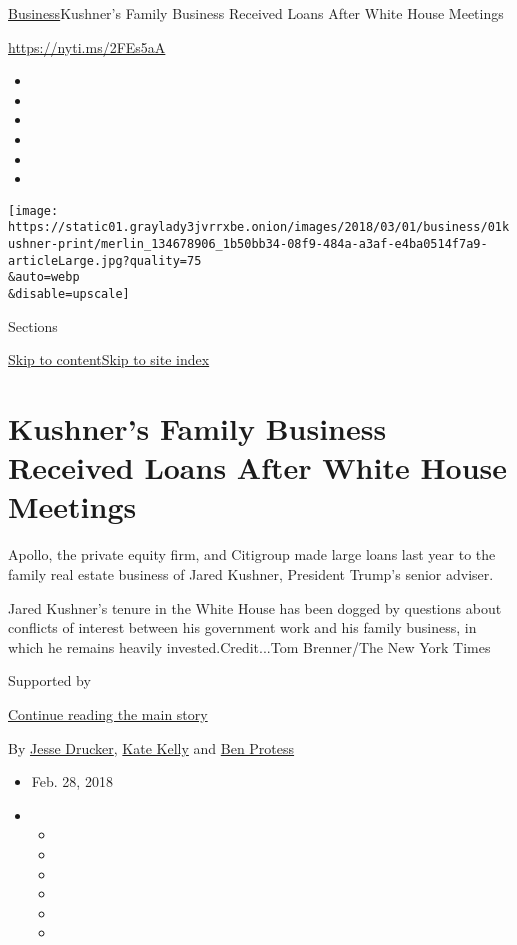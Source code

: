 \href{/section/business}{Business}\textbar{}Kushner's Family Business
Received Loans After White House Meetings

\url{https://nyti.ms/2FEs5aA}

\begin{itemize}
\item
\item
\item
\item
\item
\item
\end{itemize}

\texttt{[image: https://static01.graylady3jvrrxbe.onion/images/2018/03/01/business/01kushner-print/merlin\_134678906\_1b50bb34-08f9-484a-a3af-e4ba0514f7a9-articleLarge.jpg?quality=75\\\&auto=webp\\\&disable=upscale]}

Sections

\protect\hyperlink{site-content}{Skip to
content}\protect\hyperlink{site-index}{Skip to site index}

\hypertarget{kushners-family-business-received-loans-after-white-house-meetings}{%
\section{Kushner's Family Business Received Loans After White House
Meetings}\label{kushners-family-business-received-loans-after-white-house-meetings}}

Apollo, the private equity firm, and Citigroup made large loans last
year to the family real estate business of Jared Kushner, President
Trump's senior adviser.

Jared Kushner's tenure in the White House has been dogged by questions
about conflicts of interest between his government work and his family
business, in which he remains heavily invested.Credit...Tom Brenner/The
New York Times

Supported by

\protect\hyperlink{after-sponsor}{Continue reading the main story}

By \href{https://www.nytimes3xbfgragh.onion/by/jesse-drucker}{Jesse
Drucker}, \href{https://www.nytimes3xbfgragh.onion/by/kate-kelly}{Kate
Kelly} and \href{http://www.nytimes3xbfgragh.onion/by/ben-protess}{Ben
Protess}

\begin{itemize}
\item
  Feb. 28, 2018
\item
  \begin{itemize}
  \item
  \item
  \item
  \item
  \item
  \item
  \end{itemize}
\end{itemize}

